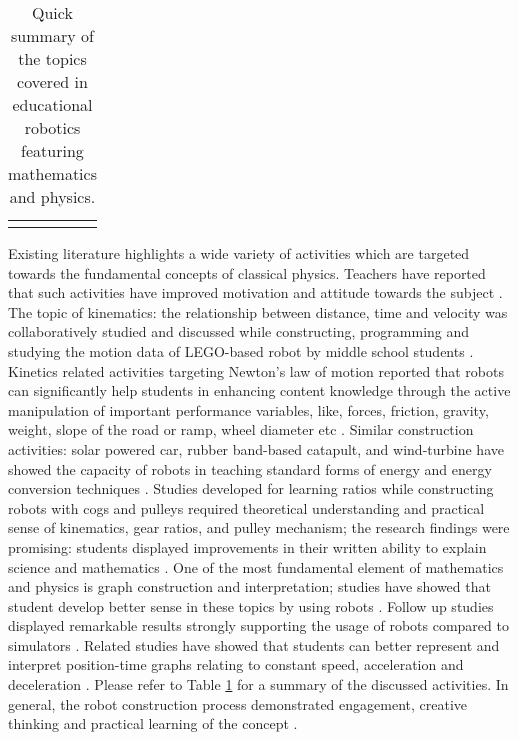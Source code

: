 \documentclass[conference]{IEEEtran}
\begin{document}
\begin{table}[h]
\begin{tabular}{ll}
                                                                                                                         
                                                                                                                         
                                                                                &                                        
                                                                                                                         
                                                                                          
\end{tabular}
\caption{Quick summary of the topics covered in educational robotics featuring mathematics and physics.}
\label{compactEDU}
\end{table}
Existing literature highlights a wide variety of activities which are targeted towards the fundamental concepts of 
classical physics. Teachers have reported that such activities have improved motivation and attitude towards the subject 
\cite{robinson2005robotics}. The topic of kinematics: the relationship between distance, time and velocity was 
collaboratively studied and discussed while constructing, programming and studying the motion data of LEGO-based robot 
by middle school students \cite{mitnik2008autonomous, mitnik2009collaborative, mikropoulos2013educational}. Kinetics 
related activities targeting Newton's law of motion reported that robots can significantly help students in enhancing 
content knowledge through the active manipulation of important performance variables, like, forces, friction, gravity, 
weight, slope of the road or ramp, wheel diameter etc \cite{williams2007acquisition}. Similar construction activities: 
solar powered car, rubber band-based catapult, and wind-turbine have showed the capacity of robots in teaching standard 
forms of energy and energy conversion techniques \cite{saygin2012design}. Studies developed for learning ratios while 
constructing robots with cogs and pulleys required theoretical understanding and practical sense of kinematics, gear 
ratios, and pulley mechanism; the research findings were promising: students displayed improvements in their written 
ability to explain science and mathematics \cite{norton2004using}. One of the most fundamental element of mathematics 
and physics is graph construction and interpretation; studies have showed that student develop better sense in these 
topics by using robots \cite{mitnik2008autonomous}. Follow up studies displayed remarkable results strongly supporting 
the usage of robots compared to simulators \cite{mitnik2009collaborative}. Related studies have showed that students 
can better represent and interpret position-time graphs relating to constant speed, acceleration and deceleration 
\cite{alimisisrobotics}. Please refer to Table \ref{compactEDU} for a summary of the discussed activities. In 
general, the robot construction process demonstrated engagement, creative thinking and practical learning of the 
concept \cite{ashdown2012robotics}.
\end{document}
